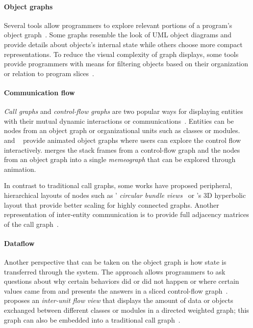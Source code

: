 \paragraph{Object graphs}

Several tools allow programmers to explore relevant portions of a program's object graph~\cite{moreno2004visualizing,gestwicki2005methodology}.
Some graphs resemble the look of UML object diagrams and provide details about objects's internal state while others choose more compact representations.
To reduce the visual complexity of graph displays, some tools provide programmers with means for filtering objects based on their organization or relation to program slices~\cite{lange1997object,hamouLhadj2004survey}.

\paragraph{Communication flow}

\emph{Call graphs} and \emph{control-flow graphs} are two popular ways for displaying entities with their mutual dynamic interactions or communications~\cite{dePauw1998execution,lange1997object,lemieux2006visualization,reiss2007visual,tramnitzke2007object,boothe2011animation,prestin2022hidden}.
Entities can be nodes from an object graph or organizational units such as classes or modules.
 and ~\cite{schweizer2014pathobjects} provide animated object graphs where users can explore the control flow interactively.
\Cite{boothe2011animation} merges the stack frames from a control-flow graph and the nodes from an object graph into a single \emph{memeograph} that can be explored through animation.

In contrast to traditional call graphs, some works have proposed peripheral, hierarchical layouts of nodes such as ' \emph{circular bundle views}~\cite{cornelissen2009trace} or \cite{munzner1997h3}'s 3D hyperbolic layout that provide better scaling for highly connected graphs.
Another representation of inter-entity communication is to provide full adjacency matrices of the call graph~\cite{dePauw1994modeling}. %

\paragraph{Dataflow}

Another perspective that can be taken on the object graph is how state is transferred through the system.
The  approach allows programmers to ask questions about why certain behaviors did or did not happen or where certain values came from and presents the answers in a sliced control-flow graph~\cite{ko2008debugging}.
\Cite{lienhard2009taking} proposes an \emph{inter-unit flow view} that displays the amount of data or objects exchanged between different classes or modules in a directed weighted graph; this graph can also be embedded into a traditional call graph~\cite{lienhard2009flow}.

